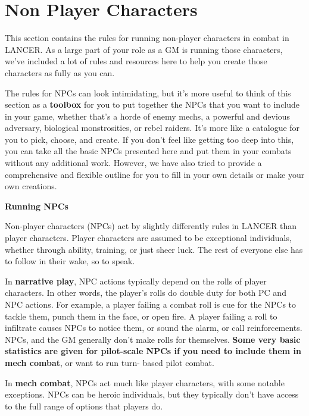 \chapter{Non Player Characters}

This section contains the rules for running non-player characters in combat in LANCER. As a
large part of your role as a GM is running those characters, we’ve included a lot of rules and
resources here to help you create those characters as fully as you can.

The rules for NPCs can look intimidating, but it’s more useful to think of this section as a \textbf{toolbox}
for you to put together the NPCs that you want to include in your game, whether that’s a horde of
enemy mechs, a powerful and devious adversary, biological monstrosities, or rebel raiders. It’s
more like a catalogue for you to pick, choose, and create. If you don’t feel like getting too deep
into this, you can take all the basic NPCs presented here and put them in your combats without
any additional work. However, we have also tried to provide a comprehensive and flexible outline
for you to fill in your own details or make your own creations.

\begin{center}
    \textbf{Running NPCs}
\end{center}

Non-player characters (NPCs) act by slightly differently rules in LANCER than player characters.
Player characters are assumed to be exceptional individuals, whether through ability, training, or
just sheer luck. The rest of everyone else has to follow in their wake, so to speak.

In \textbf{narrative play}, NPC actions typically depend on the rolls of player characters. In other words,
the player’s rolls do double duty for both PC and NPC actions. For example, a player failing a
combat roll is cue for the NPCs to tackle them, punch them in the face, or open fire. A player
failing a roll to infiltrate causes NPCs to notice them, or sound the alarm, or call reinforcements.
NPCs, and the GM generally don’t make rolls for themselves. \textbf{Some very basic statistics are
given for pilot-scale NPCs if you need to include them in mech combat}, or want to run turn-
based pilot combat.

In \textbf{mech combat}, NPCs act much like player characters, with some notable exceptions. NPCs
can be heroic individuals, but they typically don’t have access to the full range of options that
players do.
  
